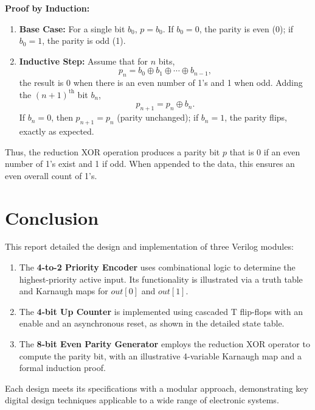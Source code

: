 \documentclass[11pt]{article}
\begin{document}
\textbf{Proof by Induction:}
\begin{enumerate}
    \item \textbf{Base Case:} For a single bit \(b_0\), \(p = b_0\). If \(b_0=0\), the parity is even (0); if \(b_0=1\), the parity is odd (1).
    \item \textbf{Inductive Step:} Assume that for \(n\) bits,
    \[
    p_n = b_0 \oplus b_1 \oplus \cdots \oplus b_{n-1},
    \]
    the result is 0 when there is an even number of 1's and 1 when odd. Adding the \((n+1)^\text{th}\) bit \(b_n\),
    \[
    p_{n+1} = p_n \oplus b_n.
    \]
    If \(b_n=0\), then \(p_{n+1}=p_n\) (parity unchanged); if \(b_n=1\), the parity flips, exactly as expected.
\end{enumerate}
Thus, the reduction XOR operation produces a parity bit \(p\) that is 0 if an even number of 1's exist and 1 if odd. When appended to the data, this ensures an even overall count of 1's.

\section{Conclusion}
This report detailed the design and implementation of three Verilog modules:
\begin{enumerate}
    \item The \textbf{4-to-2 Priority Encoder} uses combinational logic to determine the highest-priority active input. Its functionality is illustrated via a truth table and Karnaugh maps for \({out[0]}\) and \({out[1]}\).
    \item The \textbf{4-bit Up Counter} is implemented using cascaded T flip-flops with an enable and an asynchronous reset, as shown in the detailed state table.
    \item The \textbf{8-bit Even Parity Generator} employs the reduction XOR operator to compute the parity bit, with an illustrative 4-variable Karnaugh map and a formal induction proof.
\end{enumerate}
Each design meets its specifications with a modular approach, demonstrating key digital design techniques applicable to a wide range of electronic systems.
\end{document}
